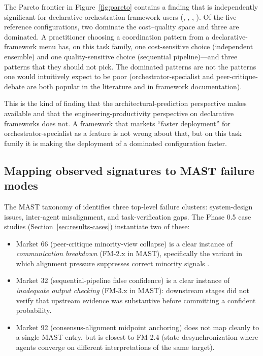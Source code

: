 \documentclass[11pt]{article}
\begin{document}
The Pareto frontier in Figure~\ref{fig:pareto} contains a finding that is independently significant for declarative-orchestration framework users (\citet{daunis2025declarative}, \citet{auton2026}, \citet{strands2025}, \citet{foundry2026}). Of the five reference configurations, two dominate the cost--quality space and three are dominated. A practitioner choosing a coordination pattern from a declarative-framework menu has, on this task family, one cost-sensitive choice (independent ensemble) and one quality-sensitive choice (sequential pipeline)---and three patterns that they should not pick. The dominated patterns are not the patterns one would intuitively expect to be poor (orchestrator-specialist and peer-critique-debate are both popular in the literature and in framework documentation).

This is the kind of finding that the architectural-prediction perspective makes available and that the engineering-productivity perspective on declarative frameworks does not. A framework that markets ``faster deployment'' for orchestrator-specialist as a feature is not wrong about that, but on this task family it is making the deployment of a dominated configuration faster.

\subsection{Mapping observed signatures to MAST failure modes}
\label{sec:discussion-mast}

The MAST taxonomy of \citet{cemri2025mast} identifies three top-level failure clusters: system-design issues, inter-agent misalignment, and task-verification gaps. The Phase 0.5 case studies (Section~\ref{sec:results-cases}) instantiate two of these:

\begin{itemize}
\item Market 66 (peer-critique minority-view collapse) is a clear instance of \emph{communication breakdown} (FM-2.x in MAST), specifically the variant in which alignment pressure suppresses correct minority signals \citep{wynn2025talk}.
\item Market 32 (sequential-pipeline false confidence) is a clear instance of \emph{inadequate output checking} (FM-3.x in MAST): downstream stages did not verify that upstream evidence was substantive before committing a confident probability.
\item Market 92 (consensus-alignment midpoint anchoring) does not map cleanly to a single MAST entry, but is closest to FM-2.4 (state desynchronization where agents converge on different interpretations of the same target).
\end{itemize}
\end{document}

